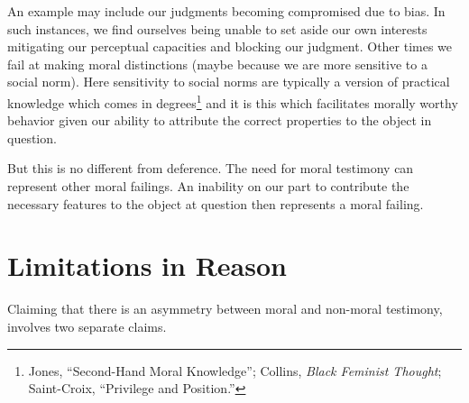 \documentclass[phdthesis,12pt,final]{wuthesis}
\theoremstyle{definition}
\theoremstyle{definition}
\theoremstyle{definition}
\theoremstyle{definition}
\theoremstyle{remark}
\begin{document}
\begin{Shaded}
\begin{Highlighting}[]

\end{Highlighting}
\end{Shaded}

\begin{Shaded}
\begin{Highlighting}[]

\end{Highlighting}
\end{Shaded}

An example may include our judgments becoming compromised due to bias. In such instances, we find ourselves being unable to set aside our own interests mitigating our perceptual capacities and blocking our judgment. Other times we fail at making moral distinctions (maybe because we are more sensitive to a social norm). Here sensitivity to social norms are typically a version of practical knowledge which comes in degrees\footnote{Jones, {``Second-{Hand Moral Knowledge}''}; Collins, \emph{Black Feminist Thought}; Saint-Croix, {``Privilege and {Position}.''}} and it is this which facilitates morally worthy behavior given our ability to attribute the correct properties to the object in question.

But this is no different from deference. The need for moral testimony can represent other moral failings. An inability on our part to contribute the necessary features to the object at question then represents a moral failing.

\section{Limitations in Reason}\label{limitations-in-reason}

Claiming that there is an asymmetry between moral and non-moral testimony, involves two separate claims.

\begin{Shaded}
\begin{Highlighting}[]

\end{Highlighting}
\end{Shaded}
\end{document}
